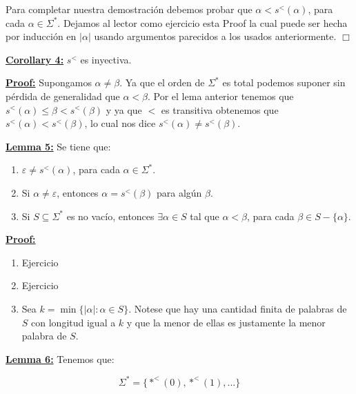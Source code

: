     \par Para completar nuestra demostración debemos probar que $\alpha < s^{<}(\alpha)$, para cada $\alpha \in
    \Sigma ^{\ast}$. Dejamos al lector como ejercicio esta Proof la cual puede ser hecha por inducción en $\left\vert
    \alpha \right\vert$ usando argumentos parecidos a los usados anteriormente. $\Box$

  \QED


  \vspace{5mm}
  \textbf{\underline{Corollary 4:}} $s^{<}$ es inyectiva.

  \textbf{\underline{Proof:}} Supongamos $\alpha \neq \beta$. Ya que el orden de $\Sigma^{\ast}$ es total podemos
    suponer sin pérdida de generalidad que $\alpha < \beta$. Por el lema anterior tenemos que $s^{<}(\alpha) \leq \beta
    < s^{<}(\beta)$ y ya que $<$ es transitiva obtenemos que $s^{<}(\alpha)< s^{<}(\beta)$, lo cual nos dice $s^{<}
    (\alpha) \neq s^{<}(\beta)$.

  \QED


  \textbf{\underline{Lemma 5:}} Se tiene que:
    \begin{enumerate}
      \item $\varepsilon \neq s^{<}(\alpha)$, para cada $\alpha \in \Sigma^{\ast}$.
      \item Si $\alpha \neq \varepsilon$, entonces $\alpha = s^{<}(\beta)$ para algún $\beta$.
      \item Si $S\subseteq \Sigma^{\ast}$ es no vacío, entonces $\exists \alpha \in S$ tal que $\alpha < \beta$, para
      cada $\beta \in S-\{\alpha\}$.
    \end{enumerate}

  \textbf{\underline{Proof:}}

    \begin{enumerate}
      \item Ejercicio
      \item Ejercicio
      \item Sea $k = \min \{\left\vert \alpha \right\vert: \alpha \in S\}$. Notese que hay una cantidad finita de
      palabras de $S$ con longitud igual a $k$ y que la menor de ellas es justamente la menor palabra de $S$.
    \end{enumerate}

  \QED


  \textbf{\underline{Lemma 6:}} Tenemos que:

    \[
      \Sigma ^{\ast }=\{\ast^{<}(0),\ast^{<}(1),...\}
    \]

